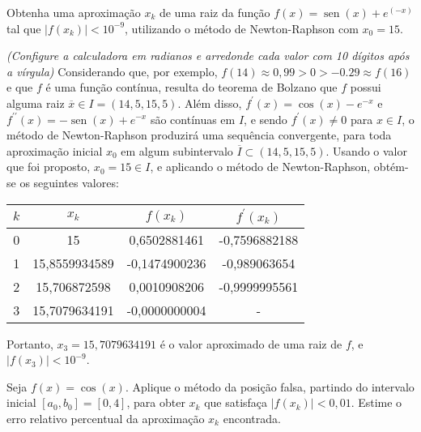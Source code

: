 \documentclass[12pt,a4paper]{article}
\newcommand*\sen{\operatorname{sen}}
\begin{document}
\begin{ExerciseList}
\Exercise[title={2,5}]
Obtenha uma aproximação $x_k$ de uma raiz da função $f(x) = \sen(x)+e^{(-x)}$ tal que $|f(x_k)|<10^{-9}$, utilizando o método de Newton-Raphson com $x_0 = 15$.

\textit{(Configure a calculadora em radianos e arredonde cada valor com 10 dígitos após a vírgula)}
\Answer Considerando que, por exemplo, $f(14) \approx 0,99 > 0 > -0.29 \approx f(16)$ e que $f$ é uma função contínua, resulta do teorema de Bolzano que $f$ possui alguma raiz $\overline{x} \in I = (14,5, 15,5)$. Além disso, $f^\prime(x) = \cos(x)-e^{-x}$ e $f^{\prime\prime}(x) = -\sen(x)+e^{-x}$ são contínuas em $I$, e sendo $f^\prime(x) \neq 0$ para $x \in I$, o método de Newton-Raphson produzirá uma sequência convergente, para toda aproximação inicial $x_0$ em algum subintervalo $\overline{I} \subset (14,5, 15,5)$. Usando o valor que foi proposto, $x_0 = 15 \in I$, e aplicando o método de Newton-Raphson, obtém-se os seguintes valores:

\begin{center}
\begin{tabular}{cccc}
\hline
$k$ & $x_k$ & $f(x_k)$ & $f^\prime(x_k)$ \\
\hline
0 & 15 & 0,6502881461 & -0,7596882188 \\
1 & 15,8559934589 & -0,1474900236 & -0,989063654 \\
2 & 15,706872598 & 0,0010908206 & -0,9999995561 \\
3 & 15,7079634191 & -0,0000000004 & - \\
\hline
\end{tabular}
\end{center}
Portanto, $x_3 = 15,7079634191$ é o valor aproximado de uma raiz de $f$, e $|f(x_3)| < 10^{-9}$.


\Exercise[title={2,5}]
Seja $f(x) = \cos(x)$. Aplique o método da posição falsa, partindo do intervalo inicial $[a_0, b_0] = [0, 4]$, para obter $x_k$ que satisfaça $|f(x_k)| < 0,01$. Estime o erro relativo percentual da aproximação $x_k$ encontrada.


\end{ExerciseList}
\end{document}
